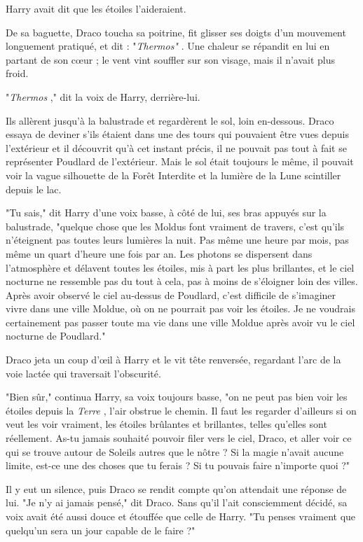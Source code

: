 Harry avait dit que les étoiles l'aideraient.

De sa baguette, Draco toucha sa poitrine, fit glisser ses doigts d'un mouvement longuement pratiqué, et dit : "\emph{Thermos"} . Une chaleur se répandit en lui en partant de son cœur ; le vent vint souffler sur son visage, mais il n'avait plus froid.

"\emph{Thermos} ," dit la voix de Harry, derrière-lui.

Ils allèrent jusqu'à la balustrade et regardèrent le sol, loin en-dessous. Draco essaya de deviner s'ils étaient dans une des tours qui pouvaient être vues depuis l'extérieur et il découvrit qu'à cet instant précis, il ne pouvait pas tout à fait se représenter Poudlard de l'extérieur. Mais le sol était toujours le même, il pouvait voir la vague silhouette de la Forêt Interdite et la lumière de la Lune scintiller depuis le lac.

"Tu sais," dit Harry d'une voix basse, à côté de lui, ses bras appuyés sur la balustrade, "quelque chose que les Moldus font vraiment de travers, c'est qu'ils n'éteignent pas toutes leurs lumières la nuit. Pas même une heure par mois, pas même un quart d'heure une fois par an. Les photons se dispersent dans l'atmosphère et délavent toutes les étoiles, mis à part les plus brillantes, et le ciel nocturne ne ressemble pas du tout à cela, pas à moins de s'éloigner loin des villes. Après avoir observé le ciel au-dessus de Poudlard, c'est difficile de s'imaginer vivre dans une ville Moldue, où on ne pourrait pas voir les étoiles. Je ne voudrais certainement pas passer toute ma vie dans une ville Moldue après avoir vu le ciel nocturne de Poudlard."

Draco jeta un coup d'œil à Harry et le vit tête renversée, regardant l'arc de la voie lactée qui traversait l'obscurité.

"Bien sûr," continua Harry, sa voix toujours basse, "on ne peut pas bien voir les étoiles depuis la \emph{Terre} , l'air obstrue le chemin. Il faut les regarder d'ailleurs si on veut les voir vraiment, les étoiles brûlantes et brillantes, telles qu'elles sont réellement. As-tu jamais souhaité pouvoir filer vers le ciel, Draco, et aller voir ce qui se trouve autour de Soleils autres que le nôtre ? Si la magie n'avait aucune limite, est-ce une des choses que tu ferais ? Si tu pouvais faire n'importe quoi ?"

Il y eut un silence, puis Draco se rendit compte qu'on attendait une réponse de lui. "Je n'y ai jamais pensé," dit Draco. Sans qu'il l'ait consciemment décidé, sa voix avait été aussi douce et étouffée que celle de Harry. "Tu penses vraiment que quelqu'un sera un jour capable de le faire ?"

